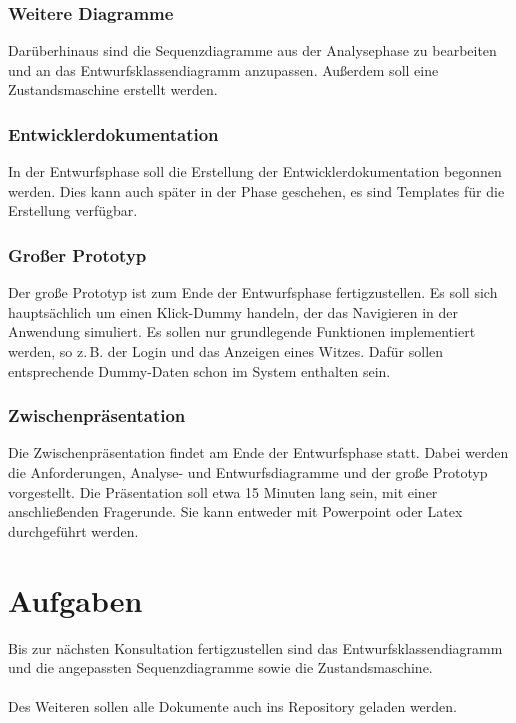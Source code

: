 \documentclass{scrartcl}
\begin{document}
\subsubsection{Weitere Diagramme}
Darüberhinaus sind die Sequenzdiagramme aus der Analysephase zu bearbeiten und an das Entwurfsklassendiagramm anzupassen. Außerdem soll eine Zustandsmaschine erstellt werden.
\subsubsection{Entwicklerdokumentation}
In der Entwurfsphase soll die Erstellung der Entwicklerdokumentation begonnen werden. Dies kann auch sp\"ater in der Phase geschehen, es sind Templates für die Erstellung verf\"ugbar.
\subsubsection{Gro\ss{}er Prototyp}
Der große Prototyp ist zum Ende der Entwurfsphase fertigzustellen. Es soll sich haupts\"achlich um einen Klick-Dummy handeln, der das Navigieren in der Anwendung simuliert. Es sollen nur grundlegende Funktionen implementiert werden, so z.\,B. der Login und das Anzeigen eines Witzes. Dafür sollen entsprechende Dummy-Daten schon im System enthalten sein.
\subsubsection{Zwischenpr\"asentation}
Die Zwischenpr\"asentation findet am Ende der Entwurfsphase statt. Dabei werden die Anforderungen, Analyse- und Entwurfsdiagramme und der große Prototyp vorgestellt. Die Pr\"asentation soll etwa 15 Minuten lang sein, mit einer anschließenden Fragerunde. Sie kann entweder mit Powerpoint oder Latex durchgeführt werden.
\vspace*{1em}

\section{Aufgaben}
Bis zur n\"achsten Konsultation fertigzustellen sind das Entwurfsklassendiagramm und die angepassten Sequenzdiagramme sowie die Zustandsmaschine.\\\\
Des Weiteren sollen alle Dokumente auch ins Repository geladen werden.
\end{document}

